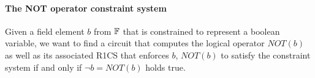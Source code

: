 \begin{exercise}

\end{exercise}
\paragraph{The NOT operator constraint system} Given a field element $b$ from $\mathbb{F}$ that is constrained to represent a boolean variable, we want to find a circuit that computes the logical  operator $NOT(b)$ as well as its associated R1CS that enforces $b$, $NOT(b)$ to satisfy the constraint system if and only if $\lnot b = NOT(b)$ holds true. 

